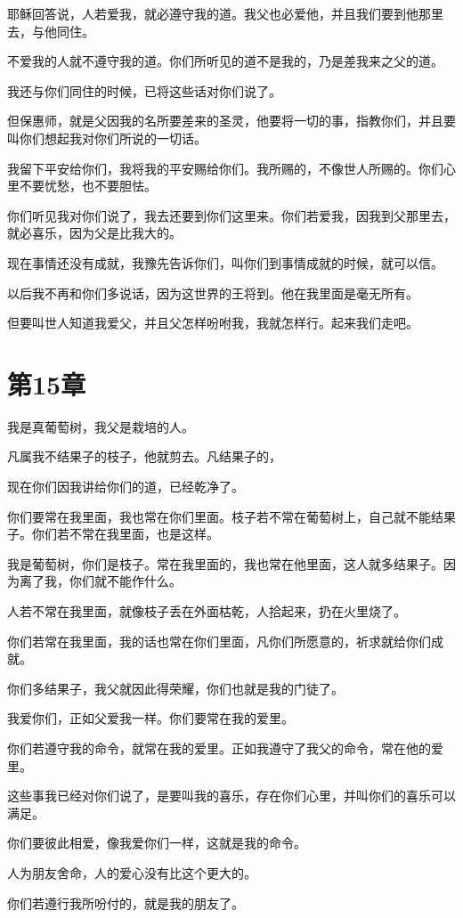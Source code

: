 \documentclass[12pt,oneside]{book}
\begin{document}
耶稣回答说，人若爱我，就必遵守我的道。我父也必爱他，并且我们要到他那里去，与他同住。

不爱我的人就不遵守我的道。你们所听见的道不是我的，乃是差我来之父的道。

我还与你们同住的时候，已将这些话对你们说了。

但保惠师，就是父因我的名所要差来的圣灵，他要将一切的事，指教你们，并且要叫你们想起我对你们所说的一切话。

我留下平安给你们，我将我的平安赐给你们。我所赐的，不像世人所赐的。你们心里不要忧愁，也不要胆怯。

你们听见我对你们说了，我去还要到你们这里来。你们若爱我，因我到父那里去，就必喜乐，因为父是比我大的。

现在事情还没有成就，我豫先告诉你们，叫你们到事情成就的时候，就可以信。

以后我不再和你们多说话，因为这世界的王将到。他在我里面是毫无所有。

但要叫世人知道我爱父，并且父怎样吩咐我，我就怎样行。起来我们走吧。

\chapter{第15章}
我是真葡萄树，我父是栽培的人。

凡属我不结果子的枝子，他就剪去。凡结果子的，

现在你们因我讲给你们的道，已经乾净了。

你们要常在我里面，我也常在你们里面。枝子若不常在葡萄树上，自己就不能结果子。你们若不常在我里面，也是这样。

我是葡萄树，你们是枝子。常在我里面的，我也常在他里面，这人就多结果子。因为离了我，你们就不能作什么。

人若不常在我里面，就像枝子丢在外面枯乾，人拾起来，扔在火里烧了。

你们若常在我里面，我的话也常在你们里面，凡你们所愿意的，祈求就给你们成就。

你们多结果子，我父就因此得荣耀，你们也就是我的门徒了。

我爱你们，正如父爱我一样。你们要常在我的爱里。

你们若遵守我的命令，就常在我的爱里。正如我遵守了我父的命令，常在他的爱里。

这些事我已经对你们说了，是要叫我的喜乐，存在你们心里，并叫你们的喜乐可以满足。

你们要彼此相爱，像我爱你们一样，这就是我的命令。

人为朋友舍命，人的爱心没有比这个更大的。

你们若遵行我所吩付的，就是我的朋友了。
\end{document}
